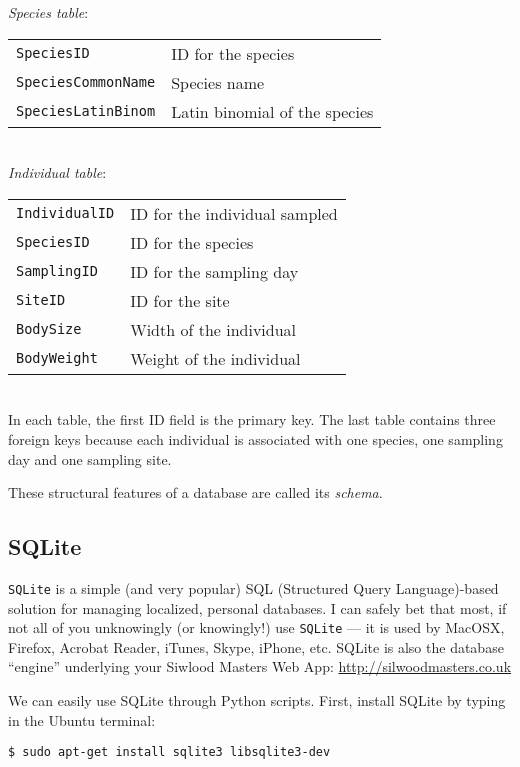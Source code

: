 {\it Species table}:\\
	\begin{tabular}{p{4cm} p{6cm}}
     {\tt SpeciesID} & ID for the species\\
     {\tt SpeciesCommonName} & Species name\\
     {\tt SpeciesLatinBinom} & Latin binomial of the species\\
    \end{tabular}\\

  {\it Individual table}:\\
 	 \begin{tabular}{p{3cm} p{6cm}}
      {\tt IndividualID} & ID for the individual sampled\\
      {\tt SpeciesID} & ID for the species\\
      {\tt SamplingID} & ID for the sampling day\\
      {\tt SiteID} & ID for the site\\
      {\tt BodySize} & Width of the individual\\
      {\tt BodyWeight} & Weight of the individual\\
    \end{tabular}\\
 
In each table, the first ID field is the primary key. The last table 
contains three foreign keys because each individual is associated with 
one species, one sampling day and one sampling site. 

These structural features of a database are called its {\it schema}.

\subsection{SQLite}

{\tt SQLite} is a simple (and very popular) SQL (Structured Query 
Language)-based solution for managing localized, personal databases. I 
can safely bet that most, if not all of you unknowingly (or knowingly!) 
use {\tt SQLite}  --- it is used by MacOSX, Firefox, Acrobat Reader, 
iTunes, Skype, iPhone, etc. SQLite is also the database ``engine'' 
underlying your Siwlood Masters Web App: 
\url{http://silwoodmasters.co.uk}

We can easily use SQLite through Python scripts. First, install 
SQLite by typing in the Ubuntu terminal:
\begin{lstlisting}
$ sudo apt-get install sqlite3 libsqlite3-dev
\end{lstlisting}

